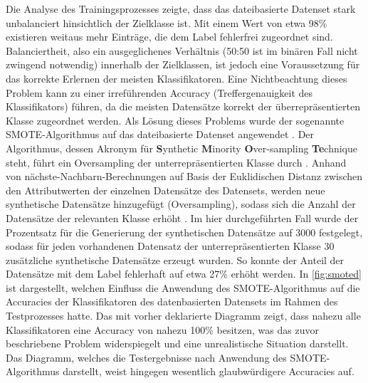 Die Analyse des Trainingsprozesses zeigte, dass das dateibasierte Datenset stark unbalanciert hinsichtlich der Zielklasse ist. Mit einem Wert von etwa 98\% existieren weitaus mehr Einträge, die dem Label \glqq fehlerfrei\grqq{} zugeordnet sind. Balanciertheit, also ein ausgeglichenes Verhältnis (50:50 ist im binären Fall nicht zwingend notwendig) innerhalb der Zielklassen, ist jedoch eine Voraussetzung für das korrekte Erlernen der meisten Klassifikatoren. Eine Nichtbeachtung dieses Problem kann zu einer irreführenden Accuracy (Treffergenauigkeit des Klassifikators) führen, da die meisten Datensätze korrekt der überrepräsentierten Klasse zugeordnet werden. Als Lösung dieses Problems wurde der sogenannte SMOTE-Algorithmus auf das dateibasierte Datenset angewendet \cite{Chawla2002}. Der Algorithmus, dessen Akronym für \textbf{S}ynthetic \textbf{M}inority \textbf{O}ver-sampling \textbf{Te}chnique steht, führt ein Oversampling der unterrepräsentierten Klasse durch \cite{Chawla2002}. Anhand von nächste-Nachbarn-Berechnungen auf Basis der Euklidischen Distanz zwischen den Attributwerten der einzelnen Datensätze des Datensets, werden neue synthetische Datensätze hinzugefügt (Oversampling), sodass sich die Anzahl der Datensätze der relevanten Klasse erhöht \cite{Chawla2002}. Im hier durchgeführten Fall wurde der Prozentsatz für die Generierung der synthetischen Datensätze auf 3000 festgelegt, sodass für jeden vorhandenen Datensatz der unterrepräsentierten Klasse 30 zusätzliche synthetische Datensätze erzeugt wurden. So konnte der Anteil der Datensätze mit dem Label \glqq fehlerhaft\grqq{} auf etwa 27\% erhöht werden. In \autoref{fig:smoted} ist dargestellt, welchen Einfluss die Anwendung des SMOTE-Algorithmus auf die Accuracies der Klassifikatoren des datenbasierten Datensets im Rahmen des Testprozesses hatte. Das mit \glqq vorher\grqq{} deklarierte Diagramm zeigt, dass nahezu alle Klassifikatoren eine Accuracy von nahezu 100\% besitzen, was das zuvor beschriebene Problem widerspiegelt und eine unrealistische Situation darstellt. Das Diagramm, welches die Testergebnisse nach Anwendung des SMOTE-Algorithmus darstellt, weist hingegen wesentlich glaubwürdigere Accuracies auf.

